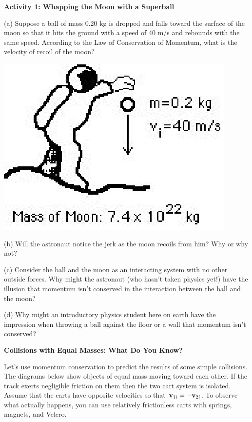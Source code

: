 \textbf{Activity 1: Whapping the Moon with a Superball} 

(a) Suppose a ball of mass 0.20 kg is dropped and falls toward the surface of
the moon so that it hits the ground with a speed of 40 m/s and rebounds with
the same speed. According to the Law of Conservation of Momentum, what is the
velocity of recoil of the moon?

\vspace{0.3cm}
{\par\raggedright \includegraphics{mom_cons/mom_cons_fig2.eps} \par}
\vspace{0.3cm}

(b) Will the astronaut notice the jerk as the moon recoils from him? Why or
why not?
\vspace{20mm}

(c) Consider the ball and the moon as an interacting system with no other outside
forces. Why might the astronaut (who hasn't taken physics yet!) have the illusion
that momentum isn't conserved in the interaction between the ball and the moon?
\vspace{20mm}

(d) Why might an introductory physics student here on earth have the impression
when throwing a ball against the floor or a wall that momentum isn't conserved?
\vspace{20mm}

\textbf{Collisions with Equal Masses: What Do You Know?} 

Let's use momentum conservation to predict the results of some simple collisions.
The diagrams below show objects of equal mass moving toward each other. If the
track exerts negligible friction on them then the two cart system is isolated.
Assume that the carts have opposite velocities so that \( {{\bf v}_{1i}} 
= - {{\bf v}_{2i}} \). To observe what actually happens, you can
use relatively frictionless carts with springs, magnets, and Velcro.

